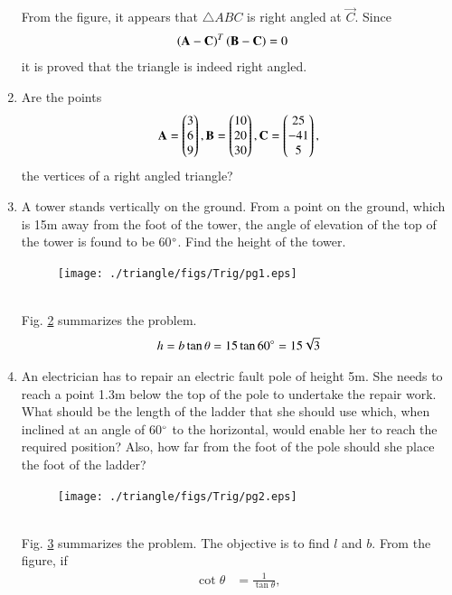 \begin{enumerate}[label=\arabic*.,ref=\thesubsection.\theenumi]
\begin{figure}[!ht]
\caption{}
\label{fig:triangle_3d}
\end{figure}
%
From the figure, it appears that $\triangle ABC$ is right angled at $\vec{C}$.  Since 
\begin{align}
\left(\mathbf{A}-\mathbf{C}\right)^T\left(\mathbf{B}-\mathbf{C}\right)&=0
\end{align}
%
it is proved that the triangle is indeed right angled.
 \item Are the points 
\begin{align}
\mathbf{A} = \begin{pmatrix}3\\6 \\9\end{pmatrix},
\mathbf{B} = \begin{pmatrix}10\\20 \\30\end{pmatrix},
\mathbf{C} = \begin{pmatrix}25\\ -41\\5\end{pmatrix},
\end{align}
%
the vertices of a right angled triangle?
%
\item A tower stands vertically on the ground.  From a point on the ground, which is 15m away from the foot of the tower, the angle of elevation of the top of the tower is found to be 60$\degree$.  Find the height of the tower.
%
\begin{figure}[!ht]
\texttt{[image: ./triangle/figs/Trig/pg1.eps]}
\caption{}
\label{fig:trig_pg1}
\end{figure}
%
\\
\solution Fig. \ref{fig:trig_pg1} summarizes the problem. 
%
\begin{align}
h = b\tan\theta = 15\tan60\degree = 15\sqrt{3}
\end{align}
%
\item An electrician has to repair an electric fault pole of height 5m.  She needs to reach a point 1.3m below the top of the pole to undertake the repair work.  What should be the length of the ladder that she should use which, when inclined at an angle of 60$\degree$ to the horizontal, would enable her to reach the required position?  Also, how far from the foot of the pole should she place the foot of the ladder?
%
\begin{figure}[!ht]
\texttt{[image: ./triangle/figs/Trig/pg2.eps]}
\caption{}
\label{fig:trig_pg2}
\end{figure}
%
\\
\solution Fig. \ref{fig:trig_pg2} summarizes the problem. The objective is to find $l$ and $b$.  From the figure,
%
if 
\begin{align}
\cot \theta &=\frac{1}{\tan \theta},
\\

\end{align}
\end{enumerate}
